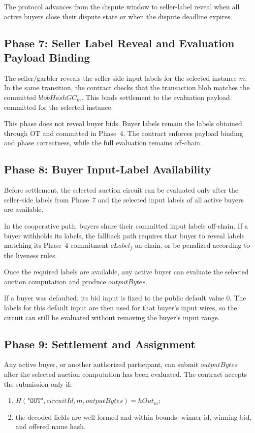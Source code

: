\documentclass[final,twoside]{vutinfth}
\begin{document}
The protocol advances from the dispute window to seller-label reveal when all
active buyers close their dispute state or when the dispute deadline expires.

\subsection{Phase 7: Seller Label Reveal and Evaluation Payload Binding}
The seller/garbler reveals the seller-side input labels for the selected
instance $m$. In the same transition, the contract checks that the transaction
blob matches the committed $blobHashGC_m$. This binds settlement to the
evaluation payload committed for the selected instance.

This phase does not reveal buyer bids. Buyer labels remain the labels obtained
through OT and committed in Phase~4. The contract enforces payload binding and
phase correctness, while the full evaluation remains off-chain.

\subsection{Phase 8: Buyer Input-Label Availability}
Before settlement, the selected auction circuit can be evaluated only after the
seller-side labels from Phase~7 and the selected input labels of all active
buyers are available.

In the cooperative path, buyers share their committed input labels off-chain.
If a buyer withholds its labels, the fallback path requires that buyer to
reveal labels matching its Phase~4 commitment $cLabel_j$ on-chain, or be
penalized according to the liveness rules.

Once the required labels are available, any active buyer can evaluate the
selected auction computation and produce $outputBytes$.

If a buyer was defaulted, its bid input is fixed to the public default value
$0$. The labels for this default input are then used for that buyer's input
wires, so the circuit can still be evaluated without removing the buyer's input
range.

\subsection{Phase 9: Settlement and Assignment}
Any active buyer, or another authorized participant, can submit $outputBytes$
after the selected auction computation has been evaluated. The contract accepts
the submission only if:
\begin{enumerate}
\item $H(\texttt{"OUT"}, circuitId, m, outputBytes) = hOut_m$;
\item the decoded fields are well-formed and within bounds: winner id, winning
bid, and offered name hash.
\end{enumerate}
\end{document}
